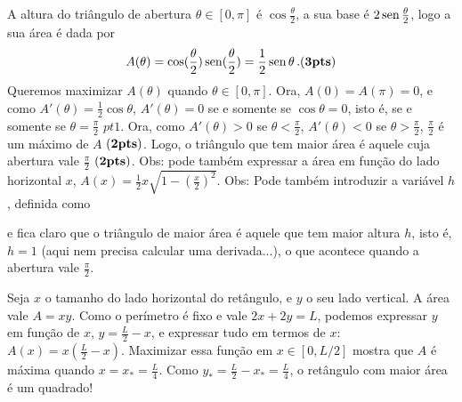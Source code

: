 \begin{Solution}{7.6}
A altura do triângulo de abertura
$\theta\in [0,\pi]$ é $\cos \frac{\theta}{2}$, a sua base é $2\operatorname{sen}
\frac{\theta}{2}$, logo a sua área é dada por
$$A(\theta)=\cos(\frac{\theta}{2})\operatorname{sen} (\frac{\theta}{2})=\frac12 \operatorname{sen}
\theta\,.(\mathbf{3}{\text{\bf pts}})$$
Queremos maximizar $A(\theta)$ quando $\theta\in [0,\pi]$.
Ora, $A(0)=A(\pi)=0$, e como $A'(\theta)=\frac12\cos \theta$,
$A'(\theta)=0$ se e somente se $\cos
\theta=0$, isto é, se e somente se $\theta=\frac{\pi}{2}$ $pt{1}$. Ora, como
$A'(\theta)>0$ se $\theta<\frac{\pi}{2}$,
$A'(\theta)<0$ se $\theta>\frac{\pi}{2}$, $\frac{\pi}{2}$ é um máximo de $A$
$(\mathbf{2}{\text{\bf pts}})$.
Logo, {o triângulo que tem maior área é aquele cuja abertura vale
$\frac{\pi}{2}$ $(\mathbf{2}{\text{\bf pts}})$.} Obs: pode também expressar a área em função do lado
horizontal $x$, $A(x)=\tfrac12 x\sqrt{1-(\tfrac{x}{2})^2}$.
Obs: Pode também introduzir a variável $h$, definida como
\begin{center}
\begin{bmlimage}\end{bmlimage}
\end{center}
e fica claro que o triângulo de maior área é aquele que tem maior altura $h$,
isto é, $h=1$ (aqui nem precisa calcular uma derivada...), o que acontece quando
a abertura vale $\frac{\pi}{2}$.
\end{Solution}
\begin{Solution}{7.7}
Seja $x$ o tamanho do lado horizontal do retângulo, e $y$ o seu lado vertical.
A área vale $A=xy$.
Como o perímetro é fixo e vale $2x+2y=L$, podemos expressar $y$ em função de
$x$, $y=\frac{L}{2}-x$, e expressar tudo em termos de $x$:
$A(x)=x(\frac{L}{2}-x)$. Maximizar essa função em $x\in [0,L/2]$ mostra que $A$
é máxima quando $x=x_*=\frac{L}{4}$. Como $y_*=\frac{L}{2}-x_*=\frac{L}{4}$, o
retângulo com maior área é um quadrado!
\end{Solution}
